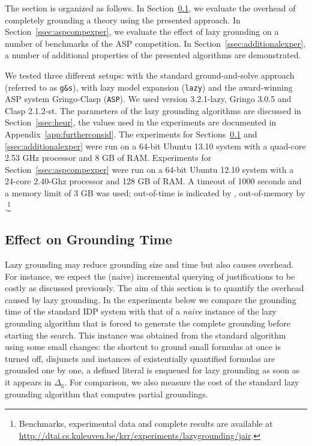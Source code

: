 \documentclass[11pt]{article}
\newcommand{\m}[1]{\ensuremath{#1}\xspace}
\newcommand{\D}{\m{\Delta}}
\newcommand{\logicname}[1]{\text{\sc #1}\xspace}
\newcommand{\idp}{\logicname{IDP}}
\theoremstyle{plain}
\theoremstyle{definition}
\theoremstyle{example_basic}
\theoremstyle{example_contd}
\theoremstyle{plain}
\newcommand{\Dg}{\ensuremath{\D_\text{g}}\xspace}
\newcommand{\change}[1]{#1}
\begin{document}
The section is organized as follows. In Section~\ref{ssec:overhead}, we evaluate the overhead of completely grounding a theory using the presented approach. In Section~\ref{ssec:aspcompexper}, we evaluate the effect of lazy grounding on a number of benchmarks of the ASP competition. In Section~\ref{ssec:additionalexper}, a number of additional properties of the presented algorithms are demonstrated.

We tested three different setups: \idp with the standard ground-and-solve approach (referred to as \texttt{g\&s}), \idp with lazy model expansion (\texttt{lazy}) and the award-winning ASP system Gringo-Clasp (\texttt{ASP}). We used \idp version 3.2.1-lazy, Gringo 3.0.5 and Clasp 2.1.2-st. \change{The parameters of the lazy grounding algorithms are discussed in Section~\ref{ssec:heur}, the values used in the experiments are documented in Appendix~\ref{app:furtherconsid}.} \change{The experiments for Sections~\ref{ssec:overhead} and \ref{ssec:additionalexper} were run on a 64-bit Ubuntu 13.10 system with a quad-core 2.53 GHz processor and 8 GB of RAM. Experiments for Section~\ref{ssec:aspcompexper} were run on a 64-bit Ubuntu 12.10 system with a 24-core 2.40-Ghz processor and 128 GB of RAM.} A timeout of 1000 seconds and a memory limit of 3 GB was used; out-of-time is indicated by \tout, out-of-memory by \mout.\footnote{Benchmarks, experimental data and complete results are available at \url{http://dtai.cs.kuleuven.be/krr/experiments/lazygrounding/jair}.}

\subsection{Effect on Grounding Time}\label{ssec:overhead}
\change{Lazy grounding may reduce grounding size and time but also causes overhead. For instance, we expect the (naive) incremental querying of justifications to be costly  as discussed previously. The aim of this section is to quantify the overhead caused by lazy grounding. In the experiments below we compare the grounding time of the standard IDP system with that of  a \emph{naive} instance of the lazy grounding algorithm that is forced to generate the complete grounding before starting the search. This instance was obtained from the standard algorithm  using some small changes: the shortcut to ground small formulas at once is turned off, disjuncts and instances of existentially quantified formulas are grounded one by one, a defined literal is enqueued for lazy grounding as soon as it appears in \Dg. For comparison, we also measure the cost of the standard lazy grounding algorithm that computes partial groundings.}
\end{document}

